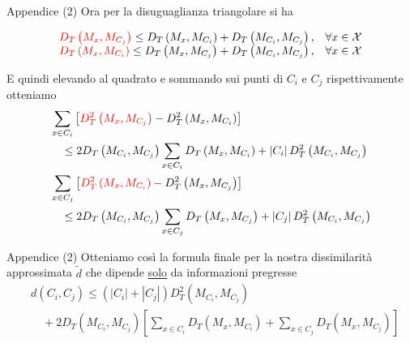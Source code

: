 \documentclass[usenames,dvipsnames,9pt]{beamer}
\theoremstyle{definition}
\begin{document}
\begin{frame}{Appendice (2)}
Ora per la disuguaglianza triangolare si ha

\begin{equation*}
  \begin{array}{ll}
    \textcolor{red}{D_{T}\left(M_{x}, M_{C_{j}}\right)} \leq D_{T}\left(M_{x}, M_{C_{i}}\right)+D_{T}\left(M_{C_{i}}, M_{C_{j}}\right), & \forall x \in \mathcal{X} \\
    \textcolor{red}{D_{T}\left(M_{x}, M_{C_{i}}\right)} \leq D_{T}\left(M_{x}, M_{C_{j}}\right)+D_{T}\left(M_{C_{i}}, M_{C_{j}}\right), & \forall x \in \mathcal{X}
    \end{array}
\end{equation*}

E quindi elevando al quadrato e sommando sui punti di $C_i$ e $C_j$ rispettivamente otteniamo
\begin{equation*}
\begin{aligned}
  &\sum_{x \in C_{i}}\left[\textcolor{red}{D_{T}^{2}\left(M_{x}, M_{C_{j}}\right)}-D_{T}^{2}\left(M_{x}, M_{C_{i}}\right)\right] \\
  &\quad \leq 2 D_{T}\left(M_{C_{i}}, M_{C_{j}}\right) \sum_{x \in C_{i}} D_{T}\left(M_{x}, M_{C_{i}}\right)+\left|C_{i}\right| D_{T}^{2}\left(M_{C_{i}}, M_{C_{j}}\right) \\
  &\sum_{x \in C_{j}}\left[\textcolor{red}{D_{T}^{2}\left(M_{x}, M_{C_{i}}\right)}-D_{T}^{2}\left(M_{x}, M_{C_{j}}\right)\right] \\
  &\quad \leq 2 D_{T}\left(M_{C_{i}}, M_{C_{j}}\right) \sum_{x \in C_{j}} D_{T}\left(M_{x}, M_{C_{j}}\right)+\left|C_{j}\right| D_{T}^{2}\left(M_{C_{i}}, M_{C_{j}}\right)
  \end{aligned}
\end{equation*}
\end{frame}

\begin{frame}{Appendice (2)}
Otteniamo così la formula finale per la nostra dissimilarità approssimata $\tilde{d}$ che dipende \underline{solo}
da informazioni pregresse
\begin{equation*}
  \begin{aligned}
    &d\left(C_{i}, C_{j}\right) \leq\left(\left|C_{i}\right|+\left|C_{j}\right|\right) D_{T}^{2}\left(M_{C_{i}}, M_{C_{j}}\right) \\
    &\quad+2 D_{T}\left(M_{C_{i}}, M_{C_{j}}\right)\left[\sum_{x \in C_{i}} D_{T}\left(M_{x}, M_{C_{i}}\right)+\sum_{x \in C_{j}} D_{T}\left(M_{x}, M_{C_{j}}\right)\right]
  \end{aligned}
\end{equation*}
\end{frame}
\end{document}

